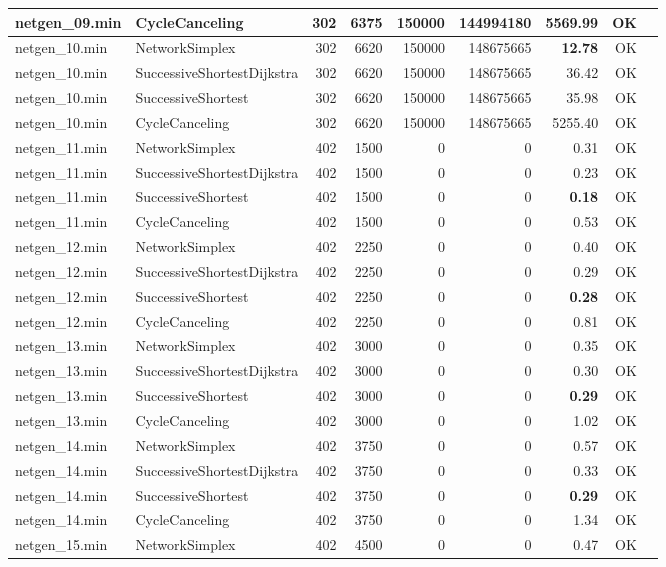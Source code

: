 \begin{longtable}{llrrrrrrl}
netgen\_09.min & CycleCanceling & 302 & 6375 & 150000 & 144994180 & 5569.99 & OK \\
\midrule
netgen\_10.min & NetworkSimplex & 302 & 6620 & 150000 & 148675665 & \textbf{12.78} & OK \\
netgen\_10.min & SuccessiveShortestDijkstra & 302 & 6620 & 150000 & 148675665 & 36.42 & OK \\
netgen\_10.min & SuccessiveShortest & 302 & 6620 & 150000 & 148675665 & 35.98 & OK \\
netgen\_10.min & CycleCanceling & 302 & 6620 & 150000 & 148675665 & 5255.40 & OK \\
\midrule
netgen\_11.min & NetworkSimplex & 402 & 1500 & 0 & 0 & 0.31 & OK \\
netgen\_11.min & SuccessiveShortestDijkstra & 402 & 1500 & 0 & 0 & 0.23 & OK \\
netgen\_11.min & SuccessiveShortest & 402 & 1500 & 0 & 0 & \textbf{0.18} & OK \\
netgen\_11.min & CycleCanceling & 402 & 1500 & 0 & 0 & 0.53 & OK \\
\midrule
netgen\_12.min & NetworkSimplex & 402 & 2250 & 0 & 0 & 0.40 & OK \\
netgen\_12.min & SuccessiveShortestDijkstra & 402 & 2250 & 0 & 0 & 0.29 & OK \\
netgen\_12.min & SuccessiveShortest & 402 & 2250 & 0 & 0 & \textbf{0.28} & OK \\
netgen\_12.min & CycleCanceling & 402 & 2250 & 0 & 0 & 0.81 & OK \\
\midrule
netgen\_13.min & NetworkSimplex & 402 & 3000 & 0 & 0 & 0.35 & OK \\
netgen\_13.min & SuccessiveShortestDijkstra & 402 & 3000 & 0 & 0 & 0.30 & OK \\
netgen\_13.min & SuccessiveShortest & 402 & 3000 & 0 & 0 & \textbf{0.29} & OK \\
netgen\_13.min & CycleCanceling & 402 & 3000 & 0 & 0 & 1.02 & OK \\
\midrule
netgen\_14.min & NetworkSimplex & 402 & 3750 & 0 & 0 & 0.57 & OK \\
netgen\_14.min & SuccessiveShortestDijkstra & 402 & 3750 & 0 & 0 & 0.33 & OK \\
netgen\_14.min & SuccessiveShortest & 402 & 3750 & 0 & 0 & \textbf{0.29} & OK \\
netgen\_14.min & CycleCanceling & 402 & 3750 & 0 & 0 & 1.34 & OK \\
\midrule
netgen\_15.min & NetworkSimplex & 402 & 4500 & 0 & 0 & 0.47 & OK \\

\end{longtable}
